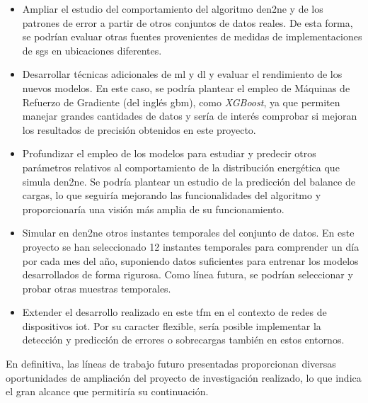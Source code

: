\begin{itemize}
    \item Ampliar el estudio del comportamiento del algoritmo \gls{den2ne} y de los patrones de error a partir de otros conjuntos de datos reales. De esta forma, se podrían evaluar otras fuentes provenientes de medidas de implementaciones de \gls{sg}s en ubicaciones diferentes.
    \item Desarrollar técnicas adicionales de \gls{ml} y \gls{dl} y evaluar el rendimiento de los nuevos modelos. En este caso, se podría plantear el empleo de Máquinas de Refuerzo de Gradiente (del inglés \gls{gbm}), como \textit{XGBoost}, ya que permiten manejar grandes cantidades de datos y sería de interés comprobar si mejoran los resultados de precisión obtenidos en este proyecto.
    \item Profundizar el empleo de los modelos para estudiar y predecir otros parámetros relativos al comportamiento de la distribución energética que simula \gls{den2ne}. Se podría plantear un estudio de la predicción del balance de cargas, lo que seguiría mejorando las funcionalidades del algoritmo y proporcionaría una visión más amplia de su funcionamiento.
    \item Simular en \gls{den2ne} otros instantes temporales del conjunto de datos. En este proyecto se han seleccionado 12 instantes temporales para comprender un día por cada mes del año, suponiendo datos suficientes para entrenar los modelos desarrollados de forma rigurosa. Como línea futura, se podrían seleccionar y probar otras muestras temporales.
    \item Extender el desarrollo realizado en este \gls{tfm} en el contexto de redes de dispositivos \gls{iot}. Por su caracter flexible, sería posible implementar la detección y predicción de errores o sobrecargas también en estos entornos.
\end{itemize}

En definitiva, las líneas de trabajo futuro presentadas proporcionan diversas oportunidades de ampliación del proyecto de investigación realizado, lo que indica el gran alcance que permitiría su continuación.
